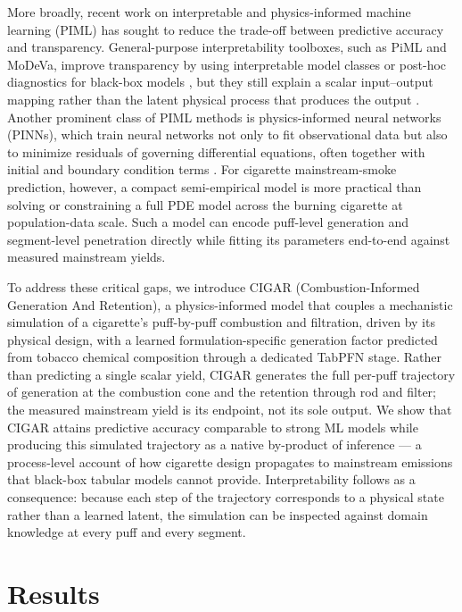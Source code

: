 ﻿\documentclass[a4paper,fleqn]{cas-sc}
\begin{document}
More broadly, recent work on interpretable and physics-informed machine learning (PIML) has sought to reduce the trade-off between predictive accuracy and transparency. General-purpose interpretability toolboxes, such as PiML and MoDeVa, improve transparency by using interpretable model classes or post-hoc diagnostics for black-box models \cite{Rudin2019InterpretableModels, sudjianto2023piml, modeva_explain_docs}, but they still explain a scalar input--output mapping rather than the latent physical process that produces the output \cite{pmlr-v108-janzing20a, Molnar2022}. Another prominent class of PIML methods is physics-informed neural networks (PINNs), which train neural networks not only to fit observational data but also to minimize residuals of governing differential equations, often together with initial and boundary condition terms \cite{RAISSI2019686, Karniadakis2021PhysicsInformedML, Cuomo2022PINN}. For cigarette mainstream-smoke prediction, however, a compact semi-empirical model is more practical than solving or constraining a full PDE model across the burning cigarette at population-data scale. Such a model can encode puff-level generation and segment-level penetration directly while fitting its parameters end-to-end against measured mainstream yields.

To address these critical gaps, we introduce CIGAR (Combustion-Informed Generation And Retention), a physics-informed model that couples a mechanistic simulation of a cigarette's puff-by-puff combustion and filtration, driven by its physical design, with a learned formulation-specific generation factor predicted from tobacco chemical composition through a dedicated TabPFN stage. Rather than predicting a single scalar yield, CIGAR generates the full per-puff trajectory of generation at the combustion cone and the retention through rod and filter; the measured mainstream yield is its endpoint, not its sole output. We show that CIGAR attains predictive accuracy comparable to strong ML models while producing this simulated trajectory as a native by-product of inference --- a process-level account of how cigarette design propagates to mainstream emissions that black-box tabular models cannot provide. Interpretability follows as a consequence: because each step of the trajectory corresponds to a physical state rather than a learned latent, the simulation can be inspected against domain knowledge at every puff and every segment.

\section{Results}
\end{document}
